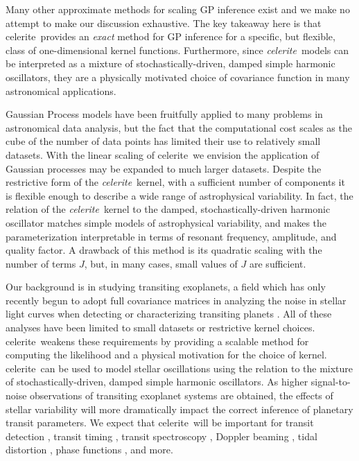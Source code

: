 \documentclass[manuscript, letterpaper]{aastex6}
\makeatletter
\let\origsection\section
\renewcommand\section{\@ifstar{\starsection}{\nostarsection}}
\newcommand\nostarsection[1]{\sectionprelude\origsection{#1}}
\newcommand\starsection[1]{\sectionprelude\origsection*{#1}}
\newcommand\sectionprelude{\vspace{1em}}
\newcommand{\project}[1]{\textsf{#1}}
\newcommand{\celerite}{\project{celerite}}
\newcommand{\celeriteterm}{\emph{celerite}}
\makeatother
\begin{document}
Many other approximate methods for scaling GP inference exist \citep[see, for
example,][and references therein]{Wilson:2015a} and we make no attempt to make
our discussion exhaustive.
The key takeaway here is that \celerite\ provides an \emph{exact} method for
GP inference for a specific, but flexible, class of one-dimensional kernel
functions.
Furthermore, since \celeriteterm\ models can be interpreted as a mixture of
stochastically-driven, damped simple harmonic oscillators, they are a
physically motivated choice of covariance function in many astronomical applications.

\section{Summary}

Gaussian Process models have been fruitfully applied to many problems in
astronomical data analysis, but the fact that the computational cost scales as
the cube of the number of data points has limited their use to relatively
small datasets.
With the linear scaling of \celerite\, we envision the application of Gaussian
processes may be expanded to much larger datasets.
Despite the restrictive form of the \celeriteterm\ kernel, with a sufficient
number of components it is flexible enough to describe a wide range of
astrophysical variability.
In fact, the relation of the \celeriteterm\ kernel to the damped, stochastically-driven harmonic
oscillator matches simple models of astrophysical variability, and makes the
parameterization interpretable in terms of resonant frequency, amplitude, and
quality factor.
A drawback of this method is its quadratic scaling with the number of
terms $J$, but, in many cases, small values of $J$ are sufficient.

Our background is in studying transiting exoplanets, a field which has only
recently begun to adopt full covariance matrices in analyzing the noise in
stellar light curves when detecting or characterizing transiting planets
\citep[for example,][]{Carter:2009, Gibson:2012, Barclay:2015, Evans:2015,
Aigrain:2016, Foreman-Mackey:2016b, Grunblatt:2016, Luger:2016}.
All of these analyses have been limited to small datasets or restrictive
kernel choices.
\celerite\ weakens these requirements by providing a scalable method for
computing the likelihood and a physical motivation for the choice of kernel.
\celerite\ can be used to model stellar oscillations using the relation to the
mixture of stochastically-driven, damped simple harmonic oscillators.
As higher signal-to-noise observations of transiting exoplanet systems are
obtained, the effects of stellar variability will more dramatically impact the
correct inference of planetary transit parameters.
We expect that \celerite\ will be important for transit detection
\citep{Pope:2016, Foreman-Mackey:2016b}, transit timing \citep{Agol:2005,
Holman:2005}, transit spectroscopy \citep{Brown:2001}, Doppler beaming
\citep{Loeb:2003, Zucker:2007}, tidal distortion \citep{Zucker:2007}, phase
functions \citep{Knutson:2007, Zucker:2007}, and more.
\end{document}
